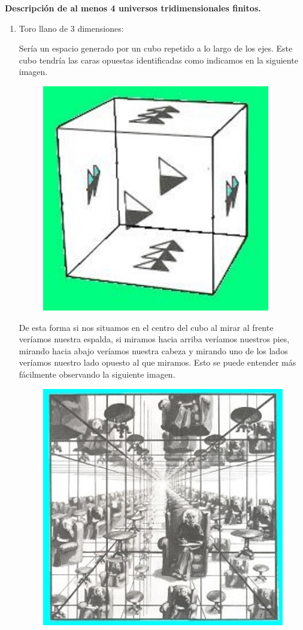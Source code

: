 \vspace{0.6cm}

\textbf{Descripción de al menos 4 universos tridimensionales finitos.}

\begin{enumerate}
\item Toro llano de 3 dimensiones:

Sería un espacio generado por un cubo repetido a lo largo de los ejes. Este cubo tendría las caras opuestas identificadas como indicamos en la siguiente imagen. 

\begin{figure}[H]
	\centering
	\includegraphics[scale=0.5]{images/universo/universo_1_1.png}
\end{figure}


De esta forma si nos situamos en el centro del cubo al mirar al frente veríamos nuestra espalda, si miramos hacia arriba veríamos nuestros pies, mirando hacia abajo veríamos nuestra cabeza y mirando uno de los lados veríamos nuestro lado opuesto al que miramos. Esto se puede entender más fácilmente observando la siguiente imagen.

\begin{figure}[H]
	\centering
	\includegraphics[scale=0.5]{images/universo/universo_1_2.png}
\end{figure}



\end{enumerate}
